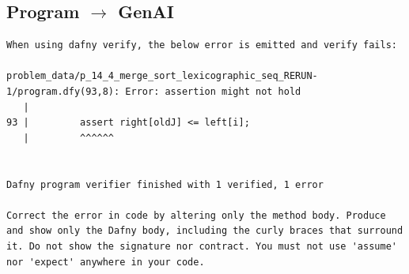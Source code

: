 \documentclass{article}
\begin{document}
\subsection*{Program $\rightarrow$ GenAI}
\begin{lstlisting}
When using dafny verify, the below error is emitted and verify fails:

problem_data/p_14_4_merge_sort_lexicographic_seq_RERUN-1/program.dfy(93,8): Error: assertion might not hold
   |
93 |         assert right[oldJ] <= left[i];
   |         ^^^^^^


Dafny program verifier finished with 1 verified, 1 error

Correct the error in code by altering only the method body. Produce and show only the Dafny body, including the curly braces that surround it. Do not show the signature nor contract. You must not use 'assume' nor 'expect' anywhere in your code.
\end{lstlisting}
\end{document}
